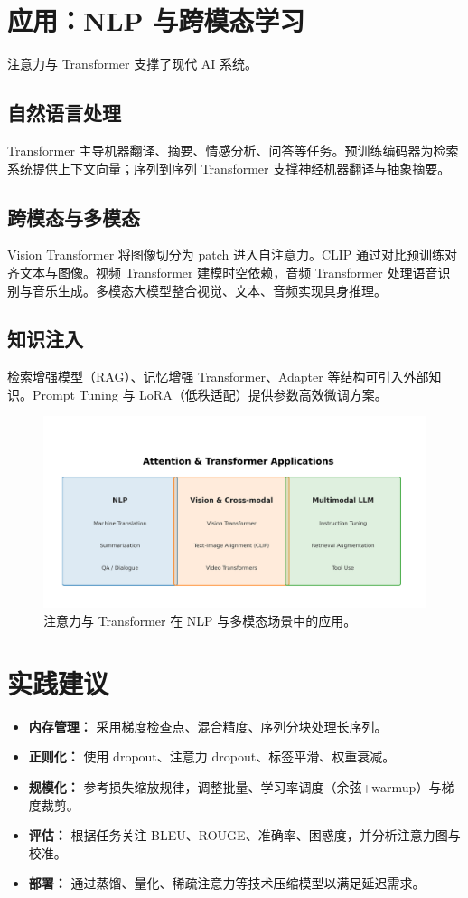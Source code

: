 ﻿\documentclass[UTF8,zihao=-4]{ctexart}
\begin{document}
\section{应用：NLP 与跨模态学习}
注意力与 Transformer 支撑了现代 AI 系统。

\subsection{自然语言处理}
Transformer 主导机器翻译、摘要、情感分析、问答等任务。预训练编码器为检索系统提供上下文向量；序列到序列 Transformer 支撑神经机器翻译与抽象摘要。

\subsection{跨模态与多模态}
Vision Transformer 将图像切分为 patch 进入自注意力。CLIP 通过对比预训练对齐文本与图像。视频 Transformer 建模时空依赖，音频 Transformer 处理语音识别与音乐生成。多模态大模型整合视觉、文本、音频实现具身推理。

\subsection{知识注入}
检索增强模型（RAG）、记忆增强 Transformer、Adapter 等结构可引入外部知识。Prompt Tuning 与 LoRA（低秩适配）提供参数高效微调方案。

\begin{figure}[H]
  \centering
  \includegraphics[width=0.85\linewidth]{attention_transformer_applications.png}
  \caption{注意力与 Transformer 在 NLP 与多模态场景中的应用。}
  \label{fig:transformer_applications_cn}
\end{figure}
\FloatBarrier

\section{实践建议}
\begin{itemize}
  \item \textbf{内存管理：} 采用梯度检查点、混合精度、序列分块处理长序列。\item \textbf{正则化：} 使用 dropout、注意力 dropout、标签平滑、权重衰减。\item \textbf{规模化：} 参考损失缩放规律，调整批量、学习率调度（余弦+warmup）与梯度裁剪。\item \textbf{评估：} 根据任务关注 BLEU、ROUGE、准确率、困惑度，并分析注意力图与校准。\item \textbf{部署：} 通过蒸馏、量化、稀疏注意力等技术压缩模型以满足延迟需求。\end{itemize}
\end{document}
